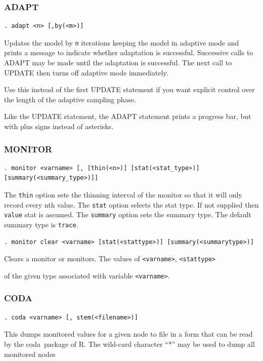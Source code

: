 \documentclass[11pt, a4paper, titlepage]{report}
\newcommand{\R}{\textsf{R}}
\newcommand{\CODA}{\textsf{coda}}
\begin{document}
\subsubsection{ADAPT}
\label{section:adapt}

\begin{verbatim}
. adapt <n> [,by(<m>)]
\end{verbatim}
Updates the model by \texttt{n} iterations keeping the model in
adaptive mode and prints a message to indicate whether adaptation is
successful.  Successive calls to ADAPT may be made until the
adaptation is successful. The next call to UPDATE then turns off
adaptive mode immediately.

Use this instead of the first UPDATE statement if you want explicit
control over the length of the adaptive sampling phase.

Like the UPDATE statement, the ADAPT statement prints a progress
bar, but with plus signs instead of asterisks.

\subsubsection{MONITOR}
\label{section:monitor}

\begin{verbatim}
. monitor <varname> [, [thin(<n>)] [stat(<stat_type>)] [summary(<summary_type>)]]
\end{verbatim}
The \texttt{thin} option sets the thinning interval of the monitor so
that it will only record every nth value. The \texttt{stat} option
selects the stat type. If not supplied then \texttt{value} stat is
assumed.  The \texttt{summary} option sets the summary type. The
default summary type is \texttt{trace}.

\begin{verbatim}
. monitor clear <varname> [stat(<stattype>)] [summary(<summarytype>)]
\end{verbatim}
Clears a monitor or monitors. The values of \texttt{<varname>},
\texttt{<stattype>}

of the given type associated with variable
\texttt{<varname>}. 

\subsubsection{CODA}
\label{coda}

\begin{verbatim}
. coda <varname> [, stem(<filename>)]
\end{verbatim}
This dumps monitored values for a given node to file in a form that
can be read by the \CODA\ package of \R.  The wild-card character
``*'' may be used to dump all monitored nodes
\end{document}
